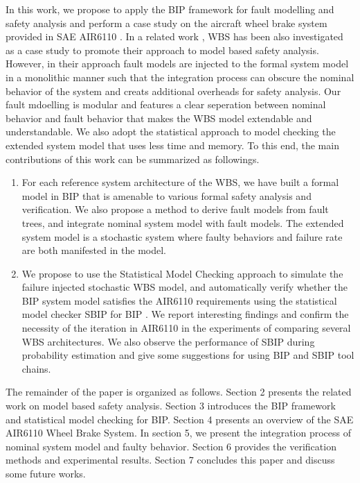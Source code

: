 In this work, we propose to apply the BIP framework for fault modelling and safety analysis 
 and perform a case study on the aircraft wheel brake system provided in SAE AIR6110 \cite{air6110}.
 In a related work \cite{cav15}, WBS has been also investigated as a case study to promote their approach to model based safety analysis.
 However,  in their approach fault models are injected to the formal system model in a monolithic manner 
 such that the integration process can obscure the nominal behavior of the system and creats additional overheads for safety analysis.
 Our fault mdoelling is modular and features a clear seperation between nominal behavior and fault behavior that makes the WBS model extendable and understandable.
 We also adopt the statistical approach to model checking the extended system model that uses less time and memory.
%
 To this end, the main contributions of this work can be summarized as followings.
%
\begin{enumerate}
\item For each reference system architecture of the WBS, we have built a formal model in BIP that is amenable to various formal safety analysis and verification.
 We also propose a method to derive fault models from fault trees, and integrate nominal system model with fault models. 
 The extended system model is a stochastic system where faulty behaviors and failure rate are both manifested in the model.

\item We propose to use the Statistical Model Checking\cite{vmcai04,cav04,cmu04} approach to simulate the failure injected stochastic WBS model,
 and automatically verify whether the BIP system model satisfies the AIR6110 requirements using the statistical model checker SBIP for BIP \cite{sbip18}.
 We report interesting findings and confirm the necessity of the iteration in AIR6110 in the experiments of comparing several WBS architectures. 
 We also observe the performance of SBIP during probability estimation and give some suggestions for using BIP and SBIP tool chains.
\end{enumerate}

The remainder of the paper is organized as follows. 
Section 2 presents the related work on model based safety analysis.
Section 3 introduces the BIP framework and statistical model checking for BIP.
Section 4 presents an overview of the SAE AIR6110 Wheel Brake System.
In section 5, we present the integration process of nominal system model and faulty behavior.
Section 6 provides the verification methods and experimental results.
Section 7 concludes this paper and discuss some future works.
